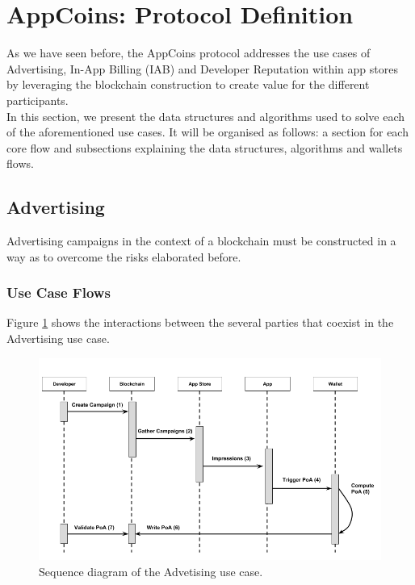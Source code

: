 \section{AppCoins: Protocol Definition}
\label{sec:protocol}

As we have seen before, the AppCoins protocol addresses the use cases of Advertising, In-App Billing (IAB) and Developer Reputation within app stores by leveraging the blockchain construction to create value for the different participants.\\

In this section, we present the data structures and algorithms used to solve each of the aforementioned use cases. It will be organised as follows: a section for each core flow and subsections explaining the data structures, algorithms and wallets flows.

\subsection{Advertising}

Advertising campaigns in the context of a blockchain must be constructed in a way as to overcome the risks elaborated before.

\subsubsection{Use Case Flows}

Figure \ref{fig:ads_sequence_diagram} shows the interactions between the several parties that coexist in the Advertising use case.

\begin{figure}[H]
\centering
\includegraphics[width=\textwidth]{diagrams/ads_sequence_diagram.png}
\caption{Sequence diagram of the Advetising use case.}
\label{fig:ads_sequence_diagram}
\end{figure}



